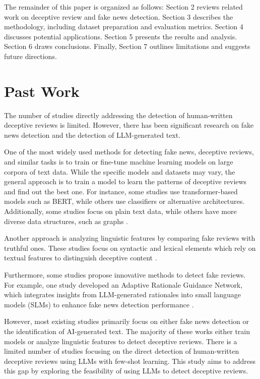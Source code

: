 \documentclass[sigconf, nonacm]{acmart}
\theoremstyle{definition}
\begin{document}
The remainder of this paper is organized as follows: Section 2 reviews related work on deceptive review and fake news detection. Section 3 describes the methodology, including dataset preparation and evaluation metrics. Section 4 discusses potential applications. Section 5 presents the results and analysis. Section 6 draws conclusions. Finally, Section 7 outlines limitations and suggests future directions.

\section{Past Work}
The number of studies directly addressing the detection of human-written deceptive reviews is limited. However, there has been significant research on fake news detection and the detection of LLM-generated text.

One of the most widely used methods for detecting fake news, deceptive reviews, and similar tasks is to train or fine-tune machine learning models on large corpora of text data. While the specific models and datasets may vary, the general approach is to train a model to learn the patterns of deceptive reviews and find out the best one. For instance, some studies use transformer-based models such as BERT, while others use classifiers or alternative architectures. Additionally, some studies focus on plain text data, while others have more diverse data structures, such as graphs \cite{liyanage-etal-2024-detecting, ott-etal-2011-finding, SALMINEN2022102771, ignat2024maideupmultilingualdeceptiondetection, 8259828}.

Another approach is analyzing linguistic features by comparing fake reviews with truthful ones. These studies focus on syntactic and lexical elements which rely on textual features to distinguish deceptive content \cite{ignat2024maideupmultilingualdeceptiondetection, 8259828, abri2020fakereviewsdetectionanalysis}.

Furthermore, some studies propose innovative methods to detect fake reviews. For example, one study developed an Adaptive Rationale Guidance Network, which integrates insights from LLM-generated rationales into small language models (SLMs) to enhance fake news detection performance \cite{Hu_2024}.

However, most existing studies primarily focus on either fake news detection or the identification of AI-generated text. The majority of these works either train models or analyze linguistic features to detect deceptive reviews. There is a limited number of studies focusing on the direct detection of human-written deceptive reviews using LLMs with few-shot learning. This study aims to address this gap by exploring the feasibility of using LLMs to detect deceptive reviews.
\end{document}
